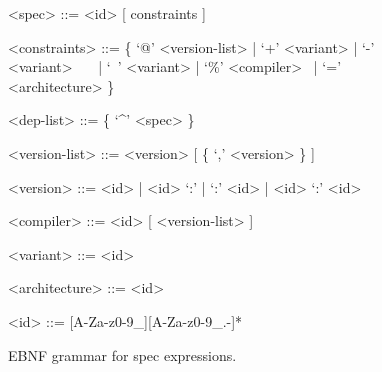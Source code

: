 \begin{figure}
\begin{grammar}\small
  <spec>         ::= <id> [ constraints ]

  <constraints>   ::= \{ `@' <version-list> | `+' <variant> \newline
                   | `-' <variant> ~~~| `~' <variant> \newline
                   | `\%' <compiler> ~| `=' <architecture> \} 

  <dep-list>  ::= \{ `\textsf \textasciicircum' <spec> \}

  <version-list> ::= <version> [ \{ `,' <version> \} ]

  <version>      ::= <id> | <id> `:' | `:' <id> | <id> `:' <id>

  <compiler>     ::= <id> [ <version-list> ]

  <variant>      ::= <id>

  <architecture> ::= <id>

  <id>           ::= [A-Za-z0-9_][A-Za-z0-9_.-]*
\end{grammar}
\caption{
	EBNF grammar for spec expressions.
	\label{fig:grammar}
}
\end{figure}


